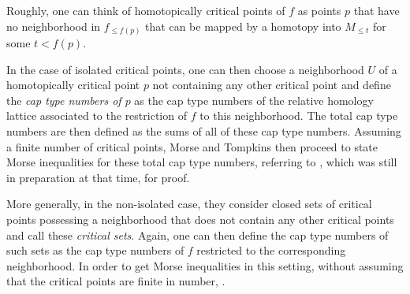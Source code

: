Roughly, one can think of homotopically critical points of $f$ as points $p$ that have no neighborhood in $f_{\leq f(p)}$ that can be mapped by a homotopy into $M_{\leq t}$ for some $t<f(p)$.

In the case of isolated critical points, one can then choose a neighborhood $U$ of a homotopically critical point $p$ not containing any other critical point and define the \emph{cap type numbers of $p$} as the cap type numbers of the relative homology lattice  associated to the restriction of $f$ to this neighborhood.
The total cap type numbers are then defined as the sums of all of these cap type numbers. 
Assuming a finite number of critical points, Morse and Tompkins then proceed to state Morse inequalities for these total cap type numbers, referring to \cite{Morse.1940}, which was still in preparation at that time, for proof. 

More generally, in the non-isolated case, they consider closed sets of critical points possessing a neighborhood that does not contain any other critical points and call these \emph{critical sets}.
Again, one can then define the cap type numbers of such sets as the cap type numbers of $f$ restricted to the corresponding neighborhood.
In order to get Morse inequalities in this setting, without assuming that the critical points are finite in number, .

